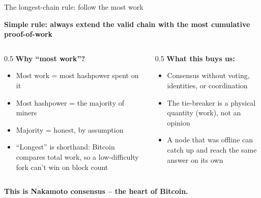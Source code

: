 \ifdefined\PRESENTATION\else\PassOptionsToClass{handout}{beamer}\fi\documentclass[aspectratio=169, lualatex]{beamer}
\begin{document}
\begin{frame}{The longest-chain rule: follow the most work}
	\begin{center}
		\textbf{Simple rule: always extend the valid chain with the most cumulative proof-of-work}
	\end{center}
	\begin{columns}[c]
		\begin{column}{0.5\textwidth}
			\textbf{Why ``most work''?}
			\begin{itemize}
				\item Most work = most hashpower spent on it
				\item Most hashpower = the majority of miners
				\item Majority = honest, by assumption
				\item ``Longest'' is shorthand: Bitcoin compares total work, so a low-difficulty fork can't win on block count
			\end{itemize}
		\end{column}
		\begin{column}{0.5\textwidth}
			\textbf{What this buys us:}
			\begin{itemize}
				\item Consensus without voting, identities, or coordination
				\item The tie-breaker is a physical quantity (work), not an opinion
				\item A node that was offline can catch up and reach the same answer on its own
			\end{itemize}
		\end{column}
	\end{columns}
	\begin{center}
		\textbf{This is Nakamoto consensus -- the heart of Bitcoin.}
	\end{center}
\end{frame}
\end{document}
